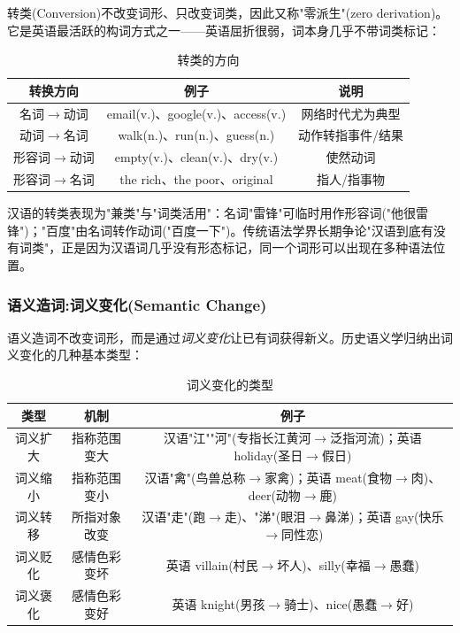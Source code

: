 转类(Conversion)不改变词形、只改变词类，因此又称"零派生"(zero derivation)。它是英语最活跃的构词方式之一——英语屈折很弱，词本身几乎不带词类标记：

\begin{table}[H]
\centering
\caption{转类的方向}
\begin{tabulary}{\textwidth}{@{}CCC@{}}
\toprule
\textbf{转换方向} & \textbf{例子} & \textbf{说明} \\
\midrule
名词$\rightarrow$动词 & email(v.)、google(v.)、access(v.) & 网络时代尤为典型 \\
动词$\rightarrow$名词 & walk(n.)、run(n.)、guess(n.) & 动作转指事件/结果 \\
形容词$\rightarrow$动词 & empty(v.)、clean(v.)、dry(v.) & 使然动词 \\
形容词$\rightarrow$名词 & the rich、the poor、original & 指人/指事物 \\
\bottomrule
\end{tabulary}
\end{table}

汉语的转类表现为"兼类"与"词类活用"：名词"雷锋"可临时用作形容词("他很雷锋")；"百度"由名词转作动词("百度一下")。传统语法学界长期争论"汉语到底有没有词类"，正是因为汉语词几乎没有形态标记，同一个词形可以出现在多种语法位置。

\subsubsection{语义造词:词义变化(Semantic Change)}

语义造词不改变词形，而是通过\emph{词义变化}让已有词获得新义。历史语义学归纳出词义变化的几种基本类型：

\begin{table}[H]
\centering
\caption{词义变化的类型}
\begin{tabulary}{\textwidth}{@{}CCC@{}}
\toprule
\textbf{类型} & \textbf{机制} & \textbf{例子} \\
\midrule
词义扩大 & 指称范围变大 & 汉语"江""河"(专指长江黄河$\rightarrow$泛指河流)；英语 holiday(圣日$\rightarrow$假日) \\
词义缩小 & 指称范围变小 & 汉语"禽"(鸟兽总称$\rightarrow$家禽)；英语 meat(食物$\rightarrow$肉)、deer(动物$\rightarrow$鹿) \\
词义转移 & 所指对象改变 & 汉语"走"(跑$\rightarrow$走)、"涕"(眼泪$\rightarrow$鼻涕)；英语 gay(快乐$\rightarrow$同性恋) \\
词义贬化 & 感情色彩变坏 & 英语 villain(村民$\rightarrow$坏人)、silly(幸福$\rightarrow$愚蠢) \\
词义褒化 & 感情色彩变好 & 英语 knight(男孩$\rightarrow$骑士)、nice(愚蠢$\rightarrow$好) \\
\bottomrule
\end{tabulary}
\end{table}

